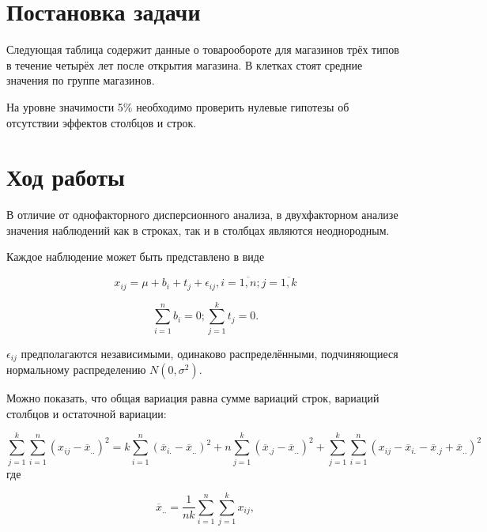 \section{Постановка задачи}

Следующая таблица содержит данные о товарообороте для магазинов трёх типов в течение четырёх лет после открытия магазина. В клетках стоят средние значения по группе магазинов.


На уровне значимости 5\% необходимо проверить нулевые гипотезы об отсутствии эффектов столбцов и строк.

\section{Ход работы}

В отличие от однофакторного дисперсионного анализа, в двухфакторном анализе значения наблюдений как в строках, так и в столбцах являются неоднородным.

Каждое наблюдение может быть представлено в виде

\begin{equation}
	x_{ij} = \mu + b_i + t_j + \epsilon_{ij}, i=\overline{1,n}; j=\overline{1,k}
\end{equation}

\begin{equation}
	\sum\limits_{i=1}^n b_i = 0; \sum\limits_{j=1}^k t_j = 0.
\end{equation}

$\epsilon_{ij}$ предполагаются независимыми, одинаково распределёнными, подчиняющиеся нормальному распределению $N(0, \sigma^2)$.

Можно показать, что общая вариация равна сумме вариаций строк, вариаций столбцов и остаточной вариации:

\begin{equation}\label{main}
	\sum\limits_{j=1}^k \sum\limits_{i=1}^n \left(x_{ij} - \overline{x}_{..}\right)^2 = k \sum\limits_{i=1}^n \left(\overline{x}_{i.} - \overline{x}_{..} \right)^2 + n \sum\limits_{j=1}^k \left(\overline{x}_{.j} - \overline{x}_{..}\right)^2 + \sum\limits_{j=1}^k \sum\limits_{i=1}^n \left(x_{ij} - \overline{x}_{i.} - \overline{x}_{.j} + \overline{x}_{..} \right)^2
\end{equation}
где

\begin{equation*}
	\overline{x}_{..} = \frac{1}{nk} \sum\limits_{i=1}^n \sum\limits_{j=1}^k x_{ij},
\end{equation*}

